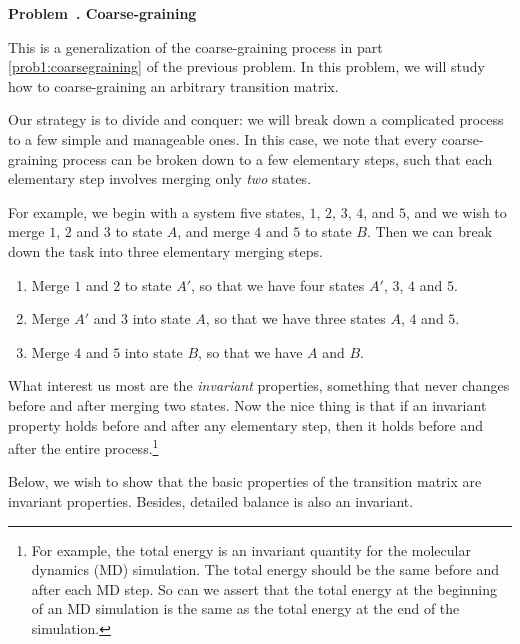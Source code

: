 \documentclass[12pt]{article}
\newcounter{problem}[section]
\newenvironment{problem}[1]
{
  \refstepcounter{problem}\par\bigskip
  \textbf{\large Problem~\theproblem. #1}
  \par\medskip
}
{ \medskip }
\begin{document}
\begin{problem}{Coarse-graining}


This is a generalization of the coarse-graining process
in part \ref{prob1:coarsegraining} of the previous problem.
%
In this problem,
we will study how to coarse-graining
an arbitrary transition matrix.

Our strategy is to divide and conquer:
we will break down a complicated process
to a few simple and manageable ones.
%
In this case, we note that every coarse-graining process
can be broken down to a few elementary steps,
such that each elementary step
involves merging only \emph{two} states.

For example, we begin with a system five states,
$1$, $2$, $3$, $4$, and $5$,
and we wish to merge $1$, $2$ and $3$
to state $A$, and merge $4$ and $5$
to state $B$.
%
Then we can break down the task into
three elementary merging steps.
\begin{enumerate}
  \item
    Merge $1$ and $2$ to state $A'$,
    so that we have four states
    $A'$, $3$, $4$ and $5$.

  \item
    Merge $A'$ and $3$ into state $A$,
    so that we have three states
    $A$, $4$ and $5$.

  \item
    Merge $4$ and $5$ into state $B$,
    so that we have
    $A$ and $B$.
\end{enumerate}

What interest us most are the \emph{invariant} properties,
something that never changes before and after
merging two states.
%
Now the nice thing is that if an invariant property
holds before and after any elementary step,
then it holds before and after the entire
process.\footnote{For example,
  the total energy is an invariant quantity
  for the molecular dynamics (MD) simulation.
  The total energy should be the same before and after
  each MD step. So can we assert that the total
  energy at the beginning of an MD simulation
  is the same as the total energy at the end
  of the simulation.
}

Below, we wish to show that the basic properties
of the transition matrix are invariant properties.
%
Besides, detailed balance is also an invariant.



%
%



\end{problem}
\end{document}
